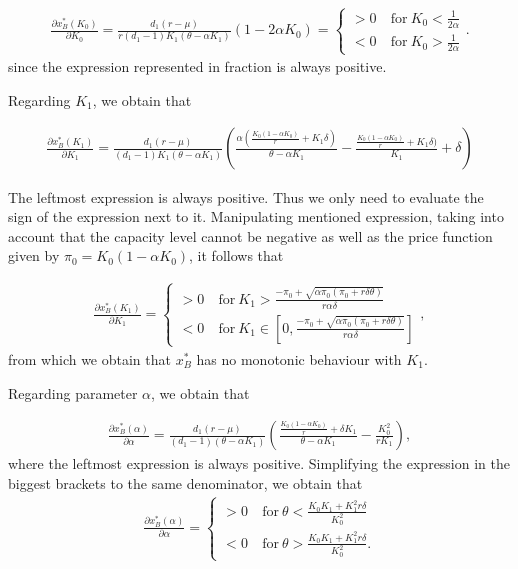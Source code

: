 \begin{align*}
\frac{\partial x^*_B ( K_0 ) }{\partial K_0}= 
\frac{d_1 (r-\mu )}{r (d_1-1)K_1(\theta-\alpha K_1)} (1-2\alpha K_0)
=
\begin{cases}
>0 &\ \text{for} \ K_0<\frac{1}{2 \alpha}\\
<0 &\ \text{for} \ K_0>\frac{1}{2 \alpha}
\end{cases}.
\end{align*}
since the expression represented in fraction is always positive.


Regarding $K_1$, we obtain that

\begin{align*}
\frac{\partial x^*_B ( K_1 ) }{\partial K_1}= 
\frac{d_1 (r-\mu )}{ (d_1-1)K_1(\theta-\alpha K_1)}  \left( \frac{\alpha (\frac{K_0(1-\alpha K_0)}{r}+K_1 \delta )}{\theta-\alpha K_1} -\frac{ \frac{K_0(1-\alpha K_0)}{r}+K_1 \delta )}{K_1}+ \delta \right)
\end{align*}


The leftmost expression is always positive. Thus we only need to evaluate the sign of the expression next to it. Manipulating mentioned expression, taking into account that the capacity level cannot be negative as well as the price function given by $\pi_0=K_0(1-\alpha K_0)$, it follows that

\begin{align*}
\frac{\partial x^*_B ( K_1 ) }{\partial K_1}= 
\begin{cases}
>0 &\ \text{for} \ K_1>\frac{-\pi_0+\sqrt{\alpha \pi_0 (\pi_0 + r \delta \theta)}}{ r\alpha \delta}\\
<0 &\ \text{for} \ K_1 \in \left[ 0, \frac{-\pi_0+\sqrt{\alpha \pi_0(\pi_0 + r \delta \theta)}}{ r\alpha \delta} \right]
\end{cases},
\end{align*}
from which we obtain that $x^*_B$ has no monotonic behaviour with $K_1$.


Regarding parameter $\alpha$, we obtain that

\begin{align*}
\frac{\partial x^*_B ( \alpha ) }{\partial \alpha}= 
\frac{d_1 (r-\mu )}{ (d_1-1)(\theta-\alpha K_1)}  \left( \frac{\frac{K_0(1-\alpha K_0)}{r}+ \delta K_1  }{\theta-\alpha K_1} -\frac{ K_0^2}{r K_1} \right),
\end{align*}
where the leftmost expression is always positive. Simplifying the expression in the biggest brackets to the same denominator, we obtain that
\begin{align*}
\frac{\partial x^*_B ( \alpha ) }{\partial \alpha}= 
\begin{cases}
>0 &\ \text{for} \ \theta < \frac{K_0 K_1 +K_1^2 r\delta}{K_0^2}\\
<0 &\ \text{for} \ \theta > \frac{K_0 K_1 +K_1^2 r\delta}{K_0^2}.
\end{cases}
\end{align*}

